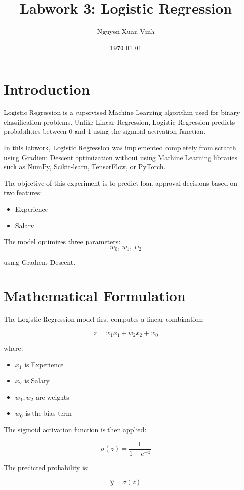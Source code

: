 \documentclass[12pt]{article}
\title{Labwork 3: Logistic Regression}
\author{Nguyen Xuan Vinh}
\date{\today}
\begin{document}
\maketitle

\section{Introduction}

Logistic Regression is a supervised Machine Learning algorithm used for binary classification problems. 
Unlike Linear Regression, Logistic Regression predicts probabilities between 0 and 1 using the sigmoid activation function.

In this labwork, Logistic Regression was implemented completely from scratch using Gradient Descent optimization without using Machine Learning libraries such as NumPy, Scikit-learn, TensorFlow, or PyTorch.

The objective of this experiment is to predict loan approval decisions based on two features:
\begin{itemize}
    \item Experience
    \item Salary
\end{itemize}

The model optimizes three parameters:
\[
w_0,\ w_1,\ w_2
\]

using Gradient Descent.

\section{Mathematical Formulation}

The Logistic Regression model first computes a linear combination:

\[
z = w_1x_1 + w_2x_2 + w_0
\]

where:
\begin{itemize}
    \item \(x_1\) is Experience
    \item \(x_2\) is Salary
    \item \(w_1, w_2\) are weights
    \item \(w_0\) is the bias term
\end{itemize}

The sigmoid activation function is then applied:

\[
\sigma(z) = \frac{1}{1 + e^{-z}}
\]

The predicted probability is:

\[
\hat{y} = \sigma(z)
\]
\end{document}

